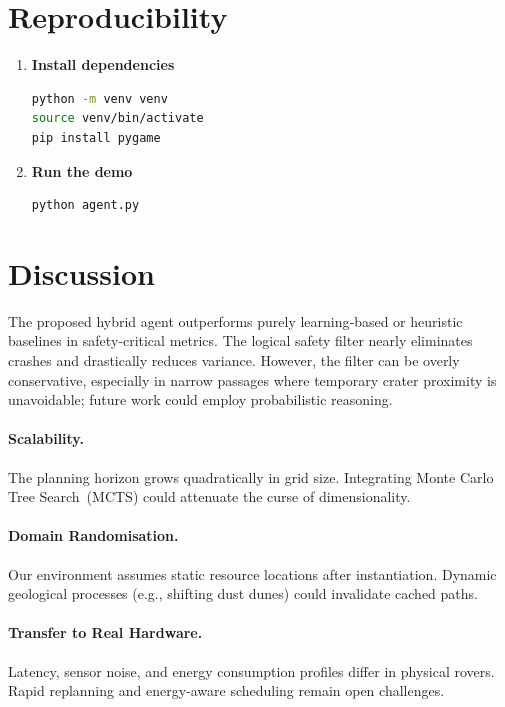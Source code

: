 \documentclass[12pt]{article}
\begin{document}
\section{Reproducibility}\label{sec:reproduce}
\begin{enumerate}
    \item \textbf{Install dependencies}
\begin{lstlisting}[language=bash]
python -m venv venv
source venv/bin/activate
pip install pygame
\end{lstlisting}
    \item \textbf{Run the demo}
\begin{lstlisting}[language=bash]
python agent.py
\end{lstlisting}
\end{enumerate}






\section{Discussion}\label{sec-discussion}
The proposed hybrid agent outperforms purely learning‑based or heuristic baselines in safety‑critical metrics.
The logical safety filter nearly eliminates crashes and drastically reduces variance.
However, the filter can be overly conservative, especially in narrow passages where temporary crater proximity is unavoidable;
future work could employ probabilistic reasoning.

\paragraph{Scalability.}
The planning horizon grows quadratically in grid size. Integrating Monte Carlo Tree Search (MCTS) could attenuate the curse of dimensionality.

\paragraph{Domain Randomisation.}
Our environment assumes static resource locations after instantiation. Dynamic geological processes (e.g., shifting dust dunes) could invalidate cached paths.

\paragraph{Transfer to Real Hardware.}
Latency, sensor noise, and energy consumption profiles differ in physical rovers. Rapid replanning and energy‑aware scheduling remain open challenges.
\end{document}
